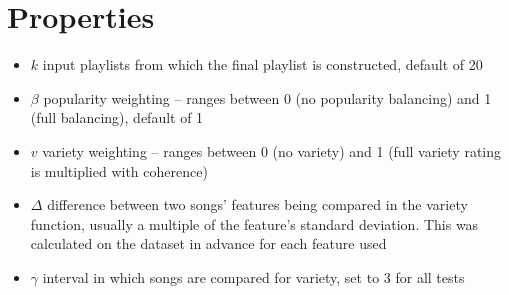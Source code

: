 \documentclass[a4paper, 12pt]{report}
\begin{document}
\section{Properties}
\begin{itemize}
    \item \(k\) input playlists from which the final playlist is constructed, default of 20
    \item \(\beta\) popularity weighting -- ranges between 0 (no popularity balancing) and 1 (full balancing), default of 1
    \item \(v\) variety weighting -- ranges between 0 (no variety) and 1 (full variety rating is multiplied with coherence)
    \item \(\Delta\) difference between two songs' features being compared in the variety function, usually a multiple of the feature's standard deviation.
    This was calculated on the dataset in advance for each feature used
    \item \(\gamma\) interval in which songs are compared for variety, set to 3 for all tests
\end{itemize}
\end{document}
